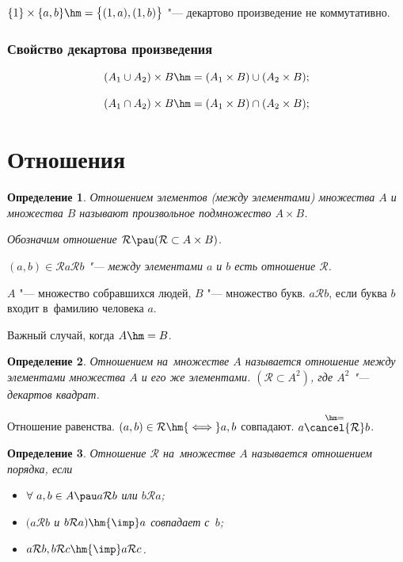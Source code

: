 \documentclass[a4paper,10pt,twoside]{article}
\newtheorem{Def}{Определение}[section]
\let\AVsection\section{}
\renewcommand\section{\newpage\scol\AVsection}
\newcommand{\scol}{  \renewcommand{\headrulewidth}{0.5pt}\fancyhead[RE,LO]{\thesection{} \leftmark} \fancyhead[LE,RO]{\thepage}}
\begin{document}
$\{1\}\times\{a,b\}\hm=\big\{(1,a),(1,b)\big\}$ "--- декартово произведение не коммутативно.

\subsubsection{Свойство декартова произведения}

\[
    (A_1\cup A_2)\times B\hm=(A_1\times B)\cup(A_2\times B);
\]

\[
    (A_1\cap A_2)\times B\hm=(A_1\times B)\cap(A_2\times B);
\]

\section{Отношения}
\begin{Def}
    Отношением элементов (между элементами) множества $A$ и множества $B$ называют произвольное подмножество $A\times B$.

    Обозначим отношение $\mathcal R\pau (\mathcal R\subset A\times B)$.

    $(a,b)\in \mathcal R$\qquad $a\mathcal Rb$ "--- между элементами $a$ и $b$ есть отношение $\mathcal R$.
\end{Def}

$A$ "--- множество собравшихся людей, $B$ "--- множество букв. $a\mathcal Rb$, если буква $b$ входит в~фамилию человека $a$.

Важный случай, когда $A\hm=B$.

\begin{Def}
    Отношением на~множестве $A$ называется отношение между элементами множества $A$ и его же элементами. $(\mathcal R\subset A^2)$, где $A^2$ "--- декартов квадрат.
\end{Def}

Отношение равенства. $(a,b)\in \mathcal R \hm{\iff} a,b$ совпадают. $a\overset{\hm=}{\cancel{\mathcal R}}b$.

\begin{Def}\label{op}
    Отношение $\mathcal R$ на~множестве $A$ называется отношением порядка, если

    \begin{itemize}
        \item[0.] \label{0}$\forall\  a,b\in A\pau a\mathcal Rb$ или $b\mathcal Ra$;

        \item[1.] $(a\mathcal Rb$ и $b\mathcal Ra)\hm{\imp} a$ совпадает с~$b$;

        \item[2.] $a\mathcal Rb,b\mathcal Rc   \hm{\imp} a\mathcal Rc$.
    \end{itemize}

\end{Def}
\end{document}
